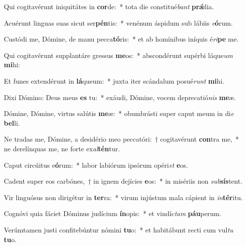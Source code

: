 \item Qui cogitavérunt iniquitátes in \textbf{cor}de:~* tota die constitué\textit{bant} \textbf{prǽ}lia.
\item Acuérunt linguas suas sicut ser\textbf{pén}tis:~* venénum áspidum sub lábiis \textit{e}\textbf{ó}rum.
\item Custódi me, Dómine, de manu pecca\textbf{tó}ris:~* et ab homínibus iníquis é\textit{ri}\textbf{pe} me.
\item Qui cogitavérunt supplantáre gressus \textbf{me}os:~* abscondérunt supérbi láque\textit{um} \textbf{mi}hi:
\item Et funes extendérunt in \textbf{lá}queum:~* juxta iter scándalum posué\textit{runt} \textbf{mi}hi.
\item Dixi Dómino: Deus meus \textbf{es} tu:~* exáudi, Dómine, vocem deprecatió\textit{nis} \textbf{me}æ.
\item Dómine, Dómine, virtus salútis \textbf{me}æ:~* obumbrásti super caput meum in di\textit{e} \textbf{bel}li.
\item Ne tradas me, Dómine, a desidério meo peccatóri:~† cogitavérunt \textbf{con}tra me,~* ne derelínquas me, ne forte ex\textit{al}\textbf{tén}tur.
\item Caput circúitus e\textbf{ó}rum:~* labor labiórum ipsórum opéri\textit{et} \textbf{e}os.
\item Cadent super eos carbónes,~† in ignem dejícies \textbf{e}os:~* in misériis non \textit{sub}\textbf{sís}tent.
\item Vir linguósus non dirigétur in \textbf{ter}ra:~* virum injústum mala cápient in \textit{in}\textbf{tér}itu.
\item Cognóvi quia fáciet Dóminus judícium \textbf{ín}opis:~* et vindíc\textit{tam} \textbf{páu}perum.
\item Verúmtamen justi confitebúntur nómini \textbf{tu}o:~* et habitábunt recti cum vul\textit{tu} \textbf{tu}o.
